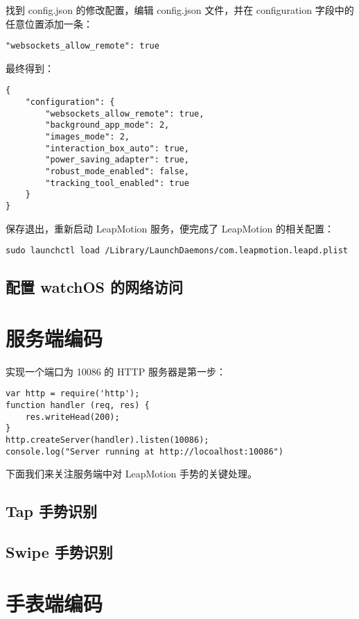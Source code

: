 找到 config.json 的修改配置，编辑 config.json 文件，并在 configuration 字段中的任意位置添加一条：
\begin{lstlisting}
"websockets_allow_remote": true
\end{lstlisting}

最终得到：

\begin{lstlisting}
{
    "configuration": {
        "websockets_allow_remote": true,
        "background_app_mode": 2,
        "images_mode": 2,
        "interaction_box_auto": true,
        "power_saving_adapter": true,
        "robust_mode_enabled": false,
        "tracking_tool_enabled": true
    }
}
\end{lstlisting}

保存退出，重新启动 LeapMotion 服务，便完成了 LeapMotion 的相关配置：

\begin{lstlisting}
sudo launchctl load /Library/LaunchDaemons/com.leapmotion.leapd.plist
\end{lstlisting}

\subsection{配置 watchOS 的网络访问}

\section{服务端编码}

实现一个端口为 10086 的 HTTP 服务器是第一步：
\begin{lstlisting}
var http = require('http');
function handler (req, res) {
    res.writeHead(200);
}
http.createServer(handler).listen(10086);
console.log("Server running at http://locoalhost:10086")
\end{lstlisting}

下面我们来关注服务端中对 LeapMotion 手势的关键处理。

\subsection{Tap 手势识别}

\subsection{Swipe 手势识别}

\section{手表端编码}
